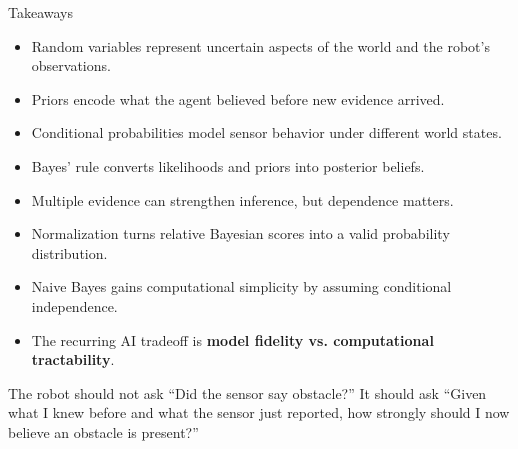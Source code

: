 \documentclass[aspectratio=169,10pt]{beamer}
\begin{document}
\begin{frame}[shrink=10]{Takeaways}
  \begin{itemize}
    \item Random variables represent uncertain aspects of the world and the robot's observations.
    \item Priors encode what the agent believed before new evidence arrived.
    \item Conditional probabilities model sensor behavior under different world states.
    \item Bayes' rule converts likelihoods and priors into posterior beliefs.
    \item Multiple evidence can strengthen inference, but dependence matters.
    \item Normalization turns relative Bayesian scores into a valid probability distribution.
    \item Naive Bayes gains computational simplicity by assuming conditional independence.
    \item The recurring AI tradeoff is \textbf{model fidelity vs. computational tractability}.
  \end{itemize}

  \begin{keyidea}
    The robot should not ask ``Did the sensor say obstacle?'' It should ask ``Given what I knew before and what the sensor just reported, how strongly should I now believe an obstacle is present?''
  \end{keyidea}
\end{frame}
\end{document}
